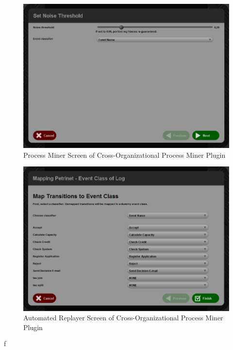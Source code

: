 \begin{figure}
	\centering
	\includegraphics[width=\textwidth]{8_appendix/proc-miner-threshold-screen}
	\caption{Process Miner Screen of Cross-Organizational Process Miner Plugin}
  \label{fig:proc-miner-threshold-screen}
\end{figure}

\begin{figure}
	\centering
	\includegraphics[width=\textwidth]{8_appendix/automated-replayer-screen}
	\caption{Automated Replayer Screen of Cross-Organizational Process Miner Plugin}
  \label{fig:automated-replayer-screen}
\end{figure}
f
